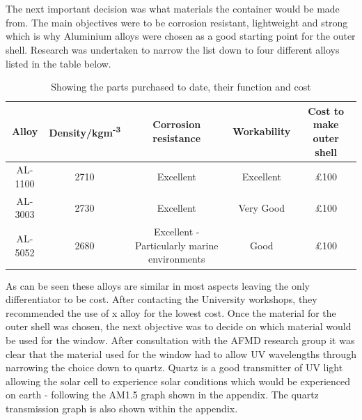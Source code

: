 \documentclass[a4paper,11pt]{article}
\begin{document}
\\
\\
The next important decision was what materials the container would be made from. The main objectives were to be corrosion resistant, lightweight and strong which is why Aluminium alloys were chosen as a good starting point for the outer shell. Research was undertaken to narrow the list down to four different alloys listed in the table below.
\begin{table}[h]
\begin{adjustbox}{width=1\textwidth}
\small
\begin{tabular}{|c|c|c|c|c|}
\hline
 Alloy&Density/kgm\textsuperscript{-3}&Corrosion resistance&Workability&Cost to make outer shell\\
 \hline
 AL-1100&2710&Excellent&Excellent&£100\\
 \hline
 AL-3003&2730&Excellent&Very Good&£100\\
 \hline
  AL-5052&2680&Excellent - Particularly marine environments&Good&£100\\
 \hline
 \end{tabular}
\end{adjustbox}
 \caption{Showing the parts purchased to date, their function and cost} 
\end{table}
 \noindent As can be seen these alloys are similar in most aspects leaving the only differentiator to be cost. After contacting the University workshops, they recommended the use of x alloy for the lowest cost. Once the material for the outer shell was chosen, the next objective was to decide on which material would be used for the window. After consultation with the AFMD research group it was clear that the material used for the window had to allow UV wavelengths through narrowing the choice down to quartz. Quartz is a good transmitter of UV light allowing the solar cell to experience solar conditions which would be experienced on earth - following the AM1.5 graph shown in the appendix. The quartz transmission graph is also shown within the appendix.
\end{document}
